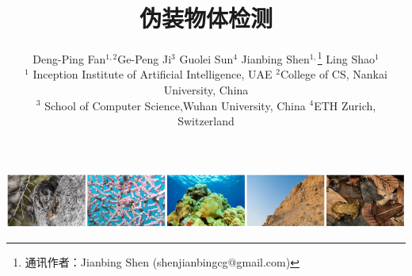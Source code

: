 \documentclass[final]{cvpr}
\begin{document}
\renewcommand{\figref}[1]{图\ref{#1}}
\renewcommand{\tabref}[1]{表\ref{#1}}
\renewcommand{\equref}[1]{式\ref{#1}}
\renewcommand{\secref}[1]{第\ref{#1}节}
\def\abstract{\centerline{\large\bf 摘要} \vspace*{12pt} \it}


\title{伪装物体检测}

\author{Deng-Ping Fan$^{1,2}$\quad Ge-Peng Ji$^{3}$ \quad Guolei Sun$^{4}$
    \quad Jianbing Shen$^{1,}$\thanks{通讯作者：Jianbing Shen (shenjianbingcg@gmail.com)}  \quad Ling Shao$^{1}$  \\
    $^{1}$ Inception Institute of Artificial Intelligence, UAE \quad$^{2}$College of CS, Nankai University, China\\
    \quad$^{3}$ School of Computer Science,Wuhan University, China \quad $^4$ETH Zurich, Switzerland 
}

\maketitle
\begin{center}
    \centering
    \includegraphics{COD_Zh_translate/figures/examples.png}
    \label{fig:什么鸟屎}
\end{center}

\end{document}
